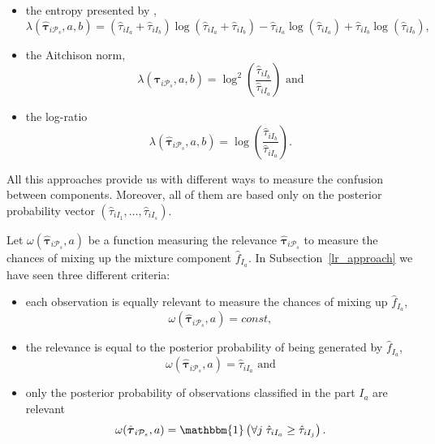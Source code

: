 \documentclass[10pt, a4paper]{article}
\newcommand{\m}[1]{\boldsymbol{#1}}
\begin{document}
\begin{spacing}{1.9}
\begin{itemize}
\item the entropy presented by \cite{baudry2010combining},
\[\lambda(\hat{\m \tau}_{i \mathcal{P}_s}, a, b) = (\hat{\tau}_{iI_a}+\hat{\tau}_{iI_b}) \log(\hat{\tau}_{iI_a} + \hat{\tau}_{iI_b}) - \hat{\tau}_{iI_a} \log(\hat{\tau}_{iI_a}) + \hat{\tau}_{iI_b} \log(\hat{\tau}_{iI_b}),\]
\item the Aitchison norm, \[\lambda(\hat{\m \tau}_{i \mathcal{P}_s}, a, b) = \log^2 (\frac{ \hat{\tau}_{iI_b} }{ \hat{\tau}_{iI_a} }) \text{ and}\]
\item the log-ratio \[ \lambda(\hat{\m \tau}_{i \mathcal{P}_s}, a, b) = \log (\frac{ \hat{\tau}_{iI_b} }{ \hat{\tau}_{iI_a} }).\]
\end{itemize}

All this approaches provide us with different ways to measure the confusion between components. Moreover, all of them are based only on the posterior probability
vector $(\hat{\tau}_{i I_{1}}, \dots, \hat{\tau}_{i I_{s}})$.

Let $\omega(\hat{\m \tau}_{i \mathcal{P}_s}, a)$ be a function measuring the relevance $\hat{\m \tau}_{i \mathcal{P}_s}$ to measure the chances of mixing up  the mixture component $\hat{f}_{I_a}$. In Subsection~\ref{lr_approach} we have seen three different criteria:

\begin{itemize}
\item each observation is equally relevant to measure the chances of mixing up  $\hat{f}_{I_a}$,
\[\omega(\hat{\m \tau}_{i \mathcal{P}_s}, a) = const,\]
\item the relevance is equal to the posterior probability of being generated by  $\hat{f}_{I_a}$,
\[\omega(\hat{\m \tau}_{i \mathcal{P}_s}, a) =  \hat{\tau}_{iI_a} \text{ and}\]
\item  only the posterior probability of observations classified in the part   $I_a$ are relevant
\[\omega(\hat{\m \tau}_{i \mathcal{P}_s}, a) = \mathbbm{1}\left( \forall j\; \hat{\tau}_{i I_{a}} \geq \hat{\tau}_{iI_j} \right).\]
\end{itemize}




\end{spacing}
\end{document}

